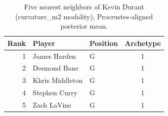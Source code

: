 \begin{table}[htbp]
  \centering\small
  \begin{tabular}{rllc}
    \toprule
    Rank & Player & Position & Archetype \\
    \midrule
    1 & James Harden & G & 1 \\
    2 & Desmond Bane & G & 1 \\
    3 & Khris Middleton & G & 1 \\
    4 & Stephen Curry & G & 1 \\
    5 & Zach LaVine & G & 1 \\
    \bottomrule
  \end{tabular}
  \caption{Five nearest neighbors of Kevin Durant (curvature_m2 modality), Procrustes-aligned posterior mean.}
  \label{tab:Kevin_Durant_neighbors_curvature_m2}
\end{table}

